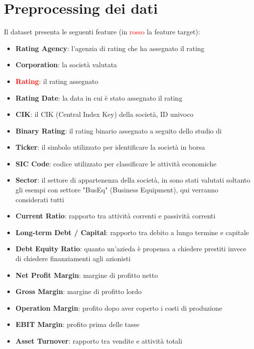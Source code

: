 \section{Preprocessing dei dati}

\noindent Il dataset presenta le seguenti feature (in \textcolor{red}{rosso} la feature target):

\begin{itemize}[label=-]
    \item \textbf{Rating Agency}: l'agenzia di rating che ha assegnato il rating
    \item \textbf{Corporation}: la società valutata
    \item \textcolor{red}{\textbf{Rating}}: il rating assegnato
    \item \textbf{Rating Date}: la data in cui è stato assegnato il rating
    \item \textbf{CIK}: il CIK (Central Index Key) della società, ID univoco
    \item \textbf{Binary Rating}: il rating binario assegnato a seguito dello studio di \cite{makwana2022get}
    \item \textbf{Ticker}: il simbolo utilizzato per identificare la società in borsa
    \item \textbf{SIC Code}: codice utilizzato per classificare le attività economiche
    \item \textbf{Sector}: il settore di appartenenza della società, in \cite{makwana2022get} sono stati valutati soltanto gli esempi con settore "BusEq" (Business Equipment), qui verranno considerati tutti
    \item \textbf{Current Ratio}: rapporto tra attività correnti e passività correnti
    \item \textbf{Long-term Debt / Capital}: rapporto tra debito a lungo termine e capitale
    \item \textbf{Debt Equity Ratio}: quanto un'azieda è propensa a chiedere prestiti invece di chiedere finanziamenti agli azionisti
    \item \textbf{Net Profit Margin}: margine di profitto netto
    \item \textbf{Gross Margin}: margine di profitto lordo
    \item \textbf{Operation Margin}: profito dopo aver coperto i costi di produzione
    \item \textbf{EBIT Margin}: profito prima delle tasse
    \item \textbf{Asset Turnover}: rapporto tra vendite e attività totali

\end{itemize}
